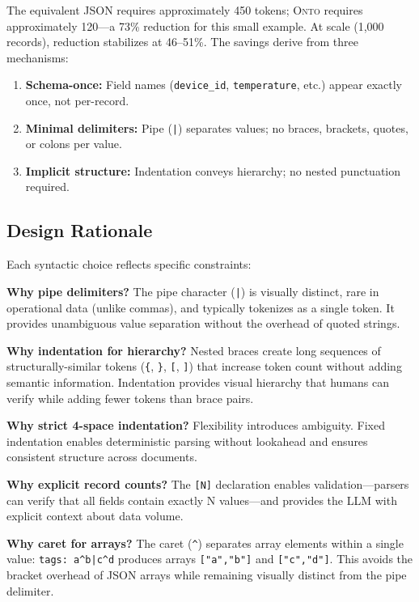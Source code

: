 \documentclass[10pt,twocolumn]{article}
\newcommand{\onto}{\textsc{Onto}\xspace}
\begin{document}
The equivalent JSON requires approximately 450 tokens; \onto requires approximately 120---a 73\% reduction for this small example. At scale (1,000 records), reduction stabilizes at 46--51\%. The savings derive from three mechanisms:

\begin{enumerate}[leftmargin=*,itemsep=0.2em]
    \item \textbf{Schema-once:} Field names (\texttt{device\_id}, \texttt{temperature}, etc.) appear exactly once, not per-record.
    
    \item \textbf{Minimal delimiters:} Pipe (\texttt{|}) separates values; no braces, brackets, quotes, or colons per value.
    
    \item \textbf{Implicit structure:} Indentation conveys hierarchy; no nested punctuation required.
\end{enumerate}

\subsection{Design Rationale}

Each syntactic choice reflects specific constraints:

\textbf{Why pipe delimiters?} The pipe character (\texttt{|}) is visually distinct, rare in operational data (unlike commas), and typically tokenizes as a single token. It provides unambiguous value separation without the overhead of quoted strings.

\textbf{Why indentation for hierarchy?} Nested braces create long sequences of structurally-similar tokens (\texttt{\{}, \texttt{\}}, \texttt{[}, \texttt{]}) that increase token count without adding semantic information. Indentation provides visual hierarchy that humans can verify while adding fewer tokens than brace pairs.

\textbf{Why strict 4-space indentation?} Flexibility introduces ambiguity. Fixed indentation enables deterministic parsing without lookahead and ensures consistent structure across documents.

\textbf{Why explicit record counts?} The \texttt{[N]} declaration enables validation---parsers can verify that all fields contain exactly N values---and provides the LLM with explicit context about data volume.

\textbf{Why caret for arrays?} The caret (\texttt{\^{}}) separates array elements within a single value: \texttt{tags: a\^{}b|c\^{}d} produces arrays \texttt{["a","b"]} and \texttt{["c","d"]}. This avoids the bracket overhead of JSON arrays while remaining visually distinct from the pipe delimiter.
\end{document}
